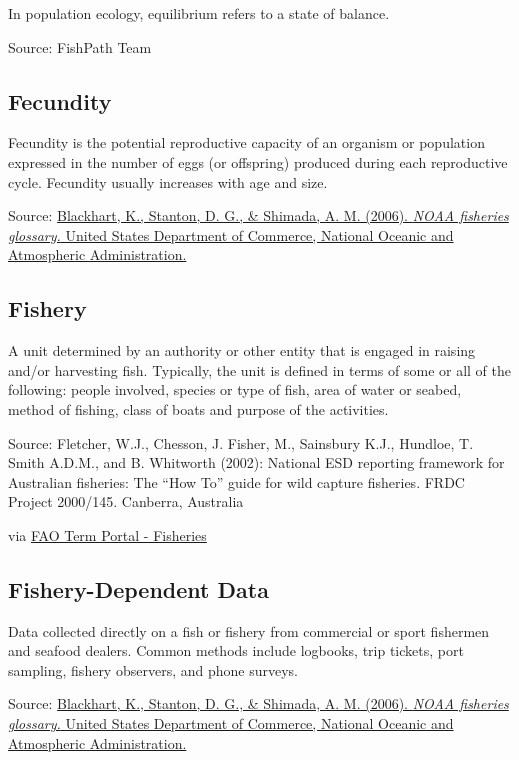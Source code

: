 \documentclass[
  11pt,
]{book}
\begin{document}
In population ecology, equilibrium refers to a state of balance.

Source: FishPath Team

\hypertarget{fecundity}{%
\subsection{Fecundity}\label{fecundity}}

Fecundity is the potential reproductive capacity of an organism or population expressed in the number of eggs (or offspring) produced during each reproductive cycle. Fecundity usually increases with age and size.

Source: \href{https://repository.library.noaa.gov/view/noaa/12856}{Blackhart, K., Stanton, D. G., \& Shimada, A. M. (2006). \emph{NOAA fisheries glossary.} United States Department of Commerce, National Oceanic and Atmospheric Administration.}

\hypertarget{fishery}{%
\subsection{Fishery}\label{fishery}}

A unit determined by an authority or other entity that is engaged in raising and/or harvesting fish. Typically, the unit is defined in terms of some or all of the following: people involved, species or type of fish, area of water or seabed, method of fishing, class of boats and purpose of the activities.

Source: Fletcher, W.J., Chesson, J. Fisher, M., Sainsbury K.J., Hundloe, T. Smith A.D.M., and B. Whitworth (2002): National ESD reporting framework for Australian fisheries: The ``How To'' guide for wild capture fisheries. FRDC Project 2000/145. Canberra, Australia

via \href{http://www.fao.org/fishery/glossary/en}{FAO Term Portal - Fisheries}

\hypertarget{fishery-dependent-data}{%
\subsection{Fishery-Dependent Data}\label{fishery-dependent-data}}

Data collected directly on a fish or fishery from commercial or sport fishermen and seafood dealers. Common methods include logbooks, trip tickets, port sampling, fishery observers, and phone surveys.

Source: \href{https://repository.library.noaa.gov/view/noaa/12856}{Blackhart, K., Stanton, D. G., \& Shimada, A. M. (2006). \emph{NOAA fisheries glossary.} United States Department of Commerce, National Oceanic and Atmospheric Administration.}
\end{document}
